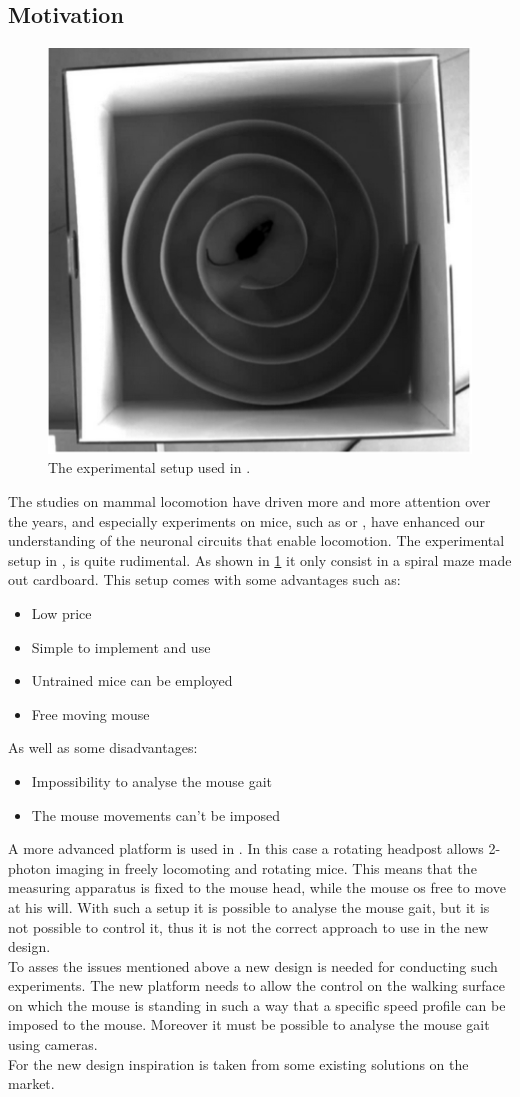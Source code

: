 \documentclass[12pt,a4paper, twoside]{article}
\begin{document}
\subsection{Motivation}
\begin{figure}[H]
	\centering
	\includegraphics[width=0.4\linewidth]{fig/OleSetup.png}
	\caption{The experimental setup used in \cite{Ole}.}\label{fig:OleSetup}
\end{figure}
The studies on mammal locomotion have driven more and more attention over the years, and especially experiments on mice, such as \cite{Ole} or \cite{Neuron}, have enhanced our understanding of the neuronal circuits that enable locomotion. The experimental setup in \cite{Ole}, is quite rudimental. As shown in \ref{fig:OleSetup} it only consist in a spiral maze made out cardboard. This setup comes with some advantages such as:

\begin{itemize}
	\item Low price
	\item Simple to implement and use
	\item Untrained mice can be employed
	\item Free moving mouse
\end{itemize}
As well as some disadvantages:
\begin{itemize}
	\item Impossibility to analyse the mouse gait
	\item The mouse movements can't be imposed
\end{itemize}

A more advanced platform is used in \cite{Neuron}. In this case a rotating headpost allows 2-photon imaging in freely locomoting and rotating mice. This means that the measuring apparatus is fixed to the mouse head, while the mouse os free to move at his will. With such a setup it is possible to analyse the mouse gait, but it is not possible to control it, thus it is not the correct approach to use in the new design.\\
To asses the issues mentioned above a new design is needed for conducting such experiments. The new platform needs to allow the control on the walking surface on which the mouse is standing in such a way that a specific speed profile can be imposed to the mouse. Moreover it must be possible to analyse the mouse gait using cameras. \\
For the new design inspiration is taken from some existing solutions on the market. 
\end{document}
